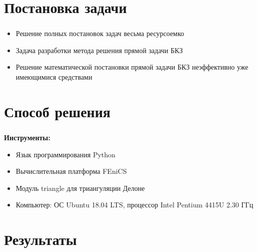 

\frame[plain]{\titlepage} %


\section{Постановка задачи}

\begin{frame}
\frametitle{\insertsection}

\begin{itemize}    
    \item Решение полных постановок задач весьма ресурсоемко
    \item Задача разработки метода решения прямой задачи БКЗ
    \item Решение математической постановки прямой задачи БКЗ неэффективно уже имеющимися средствами
\end{itemize}
\end{frame}


\section{Способ решения}

\begin{frame}
\frametitle{\insertsection}

\textbf{Инструменты:}
\begin{itemize}
    \item Язык программирования Python
    \item Вычислительная платформа FEniCS
    \item Модуль triangle для триангуляции Делоне
    \item Компьютер: ОС Ubuntu 18.04 LTS, процессор Intel Pentium 4415U 2.30 ГГц
\end{itemize}
\end{frame}


\section{Результаты}

